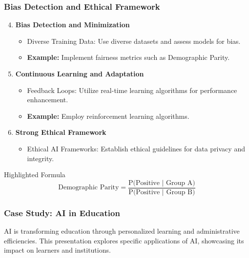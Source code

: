\documentclass[aspectratio=169]{beamer}
\begin{document}
\begin{frame}[fragile]
    \frametitle{Bias Detection and Ethical Framework}
    \begin{enumerate}
        \setcounter{enumi}{3}
        \item \textbf{Bias Detection and Minimization}
            \begin{itemize}
                \item Diverse Training Data: Use diverse datasets and assess models for bias.
                \item \textbf{Example:} Implement fairness metrics such as Demographic Parity.
            \end{itemize}
        \item \textbf{Continuous Learning and Adaptation}
            \begin{itemize}
                \item Feedback Loops: Utilize real-time learning algorithms for performance enhancement.
                \item \textbf{Example:} Employ reinforcement learning algorithms.
            \end{itemize}
        \item \textbf{Strong Ethical Framework}
            \begin{itemize}
                \item Ethical AI Frameworks: Establish ethical guidelines for data privacy and integrity.
            \end{itemize}
    \end{enumerate}
    
    \begin{block}{Highlighted Formula}
        \[
        \text{Demographic Parity} = \frac{\text{P(Positive | Group A)}}{\text{P(Positive | Group B)}}
        \]
    \end{block}
\end{frame}

\begin{frame}[fragile]
    \frametitle{Case Study: AI in Education}
    AI is transforming education through personalized learning and administrative efficiencies. This presentation explores specific applications of AI, showcasing its impact on learners and institutions.
\end{frame}
\end{document}
